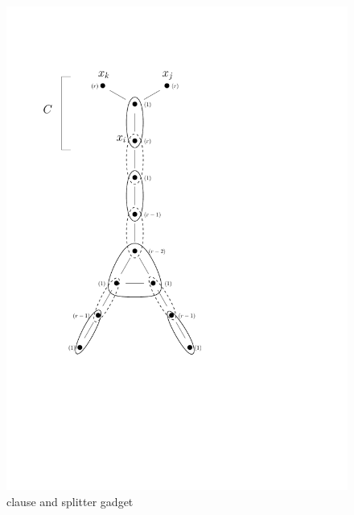 \documentclass[11pt]{article}
\begin{document}
\begin{figure}[htbp]
\begin{center}
\includegraphics[scale=.6]{figs/hardness}
\caption{clause and splitter gadget}
\label{fig:3satconstruction}
\end{center}
\end{figure}
\end{document}
